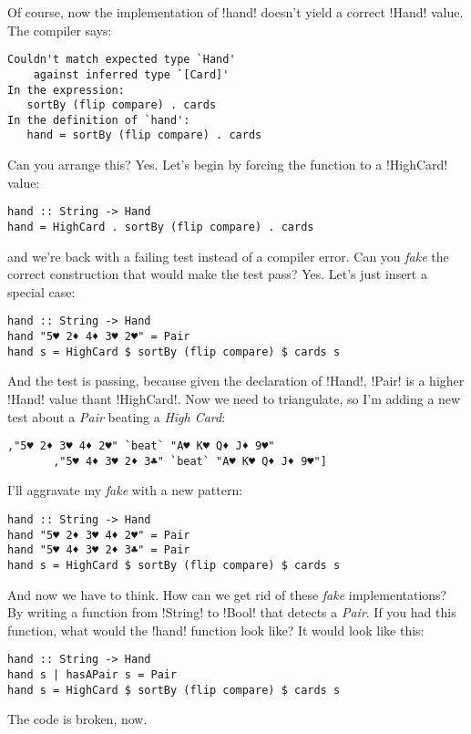\error Of course, now the implementation of \il!hand! doesn't yield a correct \il!Hand! value.
\lhN The compiler says:
\begin{small}
\begin{verbatim}
Couldn't match expected type `Hand' 
    against inferred type `[Card]'
In the expression: 
   sortBy (flip compare) . cards
In the definition of `hand': 
   hand = sortBy (flip compare) . cards
\end{verbatim}
\end{small}
Can you arrange this?
\lhA Yes. Let's begin by forcing the function to a \il!HighCard! value:
\begin{lstlisting}[frame=single]
hand :: String -> Hand
hand = HighCard . sortBy (flip compare) . cards
\end{lstlisting}
\failure and we're back with a failing test instead of a compiler error.
\lhN Can you \emph{fake} the correct construction that would make the test pass?
\lhA Yes. Let's just insert a special case:
\begin{lstlisting}[frame=single]
hand :: String -> Hand
hand "5♥ 2♦ 4♦ 3♥ 2♥" = Pair 
hand s = HighCard $ sortBy (flip compare) $ cards s
\end{lstlisting}
\success And the test is passing, because given the declaration of \il!Hand!, \il!Pair! is a higher \il!Hand! value thant \il!HighCard!.
\lhN Now we need to triangulate, so I'm adding a new test about a \emph{Pair} beating a \emph{High Card}:
\begin{lstlisting}[frame=single]
       ,"5♥ 2♦ 3♥ 4♦ 2♥" `beat` "A♥ K♥ Q♦ J♦ 9♥"
       ,"5♥ 4♦ 3♥ 2♦ 3♣" `beat` "A♥ K♥ Q♦ J♦ 9♥"]
\end{lstlisting}
\lhA \failure I'll aggravate my \emph{fake} with a new pattern:
\begin{lstlisting}[frame=single]
hand :: String -> Hand
hand "5♥ 2♦ 3♥ 4♦ 2♥" = Pair 
hand "5♥ 4♦ 3♥ 2♦ 3♣" = Pair
hand s = HighCard $ sortBy (flip compare) $ cards s
\end{lstlisting}
\success And now we have to think.
\lhN How can we get rid of these \emph{fake} implementations?
\lhA By writing a function from \il!String! to \il!Bool! that detects a \emph{Pair}.
\lhN If you had this function, what would the \il!hand! function look like?
\lhA It would look like this:
\begin{lstlisting}[frame=single]
hand :: String -> Hand
hand s | hasAPair s = Pair
hand s = HighCard $ sortBy (flip compare) $ cards s
\end{lstlisting}
\error The code is broken, now.
